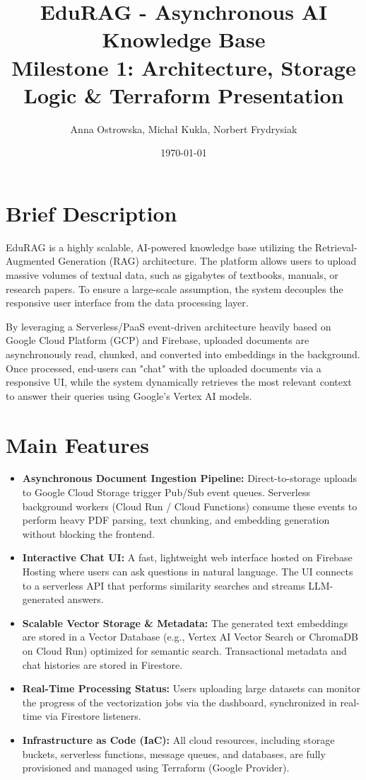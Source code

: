\documentclass[12pt,a4paper]{article}
\title{\textbf{EduRAG - Asynchronous AI Knowledge Base} \\ \large Milestone 1: Architecture, Storage Logic \& Terraform Presentation}
\author{Anna Ostrowska, Michał Kukla, Norbert Frydrysiak}
\date{\today}
\begin{document}
\maketitle

\section{Brief Description}
EduRAG is a highly scalable, AI-powered knowledge base utilizing the Retrieval-Augmented Generation (RAG) architecture. The platform allows users to upload massive volumes of textual data, such as gigabytes of textbooks, manuals, or research papers. To ensure a large-scale assumption, the system decouples the responsive user interface from the data processing layer. 

By leveraging a Serverless/PaaS event-driven architecture heavily based on Google Cloud Platform (GCP) and Firebase, uploaded documents are asynchronously read, chunked, and converted into embeddings in the background. Once processed, end-users can "chat" with the uploaded documents via a responsive UI, while the system dynamically retrieves the most relevant context to answer their queries using Google's Vertex AI models.

\section{Main Features}
\begin{itemize}[label=\textbullet]
    \item \textbf{Asynchronous Document Ingestion Pipeline:} Direct-to-storage uploads to Google Cloud Storage trigger Pub/Sub event queues. Serverless background workers (Cloud Run / Cloud Functions) consume these events to perform heavy PDF parsing, text chunking, and embedding generation without blocking the frontend.
    \item \textbf{Interactive Chat UI:} A fast, lightweight web interface hosted on Firebase Hosting where users can ask questions in natural language. The UI connects to a serverless API that performs similarity searches and streams LLM-generated answers.
    \item \textbf{Scalable Vector Storage \& Metadata:} The generated text embeddings are stored in a Vector Database (e.g., Vertex AI Vector Search or ChromaDB on Cloud Run) optimized for semantic search. Transactional metadata and chat histories are stored in Firestore.
    \item \textbf{Real-Time Processing Status:} Users uploading large datasets can monitor the progress of the vectorization jobs via the dashboard, synchronized in real-time via Firestore listeners.
    \item \textbf{Infrastructure as Code (IaC):} All cloud resources, including storage buckets, serverless functions, message queues, and databases, are fully provisioned and managed using Terraform (Google Provider).
\end{itemize}
\end{document}
